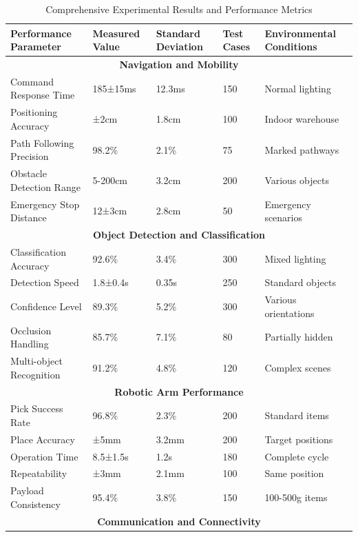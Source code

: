 \begin{table}[h!]
\centering
\caption{Comprehensive Experimental Results and Performance Metrics}
\label{tab:experimental_results}
\renewcommand{\arraystretch}{1.4}
\begin{tabular}{|p{4cm}|p{2.5cm}|p{2cm}|p{2cm}|p{2.5cm}|}
\hline
\textbf{Performance Parameter} & \textbf{Measured Value} & \textbf{Standard Deviation} & \textbf{Test Cases} & \textbf{Environmental Conditions} \\
\hline
\hline
\multicolumn{5}{|c|}{\textbf{Navigation and Mobility}} \\
\hline
Command Response Time & 185±15ms & 12.3ms & 150 & Normal lighting \\
\hline
Positioning Accuracy & ±2cm & 1.8cm & 100 & Indoor warehouse \\
\hline
Path Following Precision & 98.2\% & 2.1\% & 75 & Marked pathways \\
\hline
Obstacle Detection Range & 5-200cm & 3.2cm & 200 & Various objects \\
\hline
Emergency Stop Distance & 12±3cm & 2.8cm & 50 & Emergency scenarios \\
\hline
\multicolumn{5}{|c|}{\textbf{Object Detection and Classification}} \\
\hline
Classification Accuracy & 92.6\% & 3.4\% & 300 & Mixed lighting \\
\hline
Detection Speed & 1.8±0.4s & 0.35s & 250 & Standard objects \\
\hline
Confidence Level & 89.3\% & 5.2\% & 300 & Various orientations \\
\hline
Occlusion Handling & 85.7\% & 7.1\% & 80 & Partially hidden \\
\hline
Multi-object Recognition & 91.2\% & 4.8\% & 120 & Complex scenes \\
\hline
\multicolumn{5}{|c|}{\textbf{Robotic Arm Performance}} \\
\hline
Pick Success Rate & 96.8\% & 2.3\% & 200 & Standard items \\
\hline
Place Accuracy & ±5mm & 3.2mm & 200 & Target positions \\
\hline
Operation Time & 8.5±1.5s & 1.2s & 180 & Complete cycle \\
\hline
Repeatability & ±3mm & 2.1mm & 100 & Same position \\
\hline
Payload Consistency & 95.4\% & 3.8\% & 150 & 100-500g items \\
\hline
\multicolumn{5}{|c|}{\textbf{Communication and Connectivity}} \\

\end{tabular}
\end{table}
